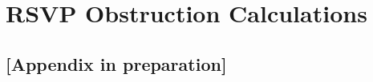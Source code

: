 \chapter{RSVP Obstruction Calculations}
\label{app:obstruction}
\section*{[Appendix in preparation]}
